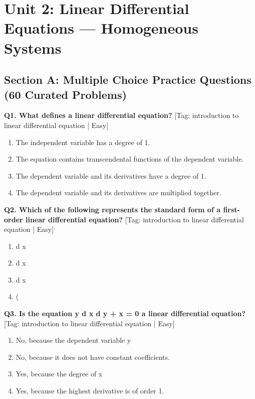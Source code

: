 \chapter{Unit 2: Linear Differential Equations --- Homogeneous Systems}

\section{Section A: Multiple Choice Practice Questions (60 Curated Problems)}

\noindent\textbf{Q1. What defines a linear differential equation?} \hfill [Tag: introduction to linear differential equation | Easy]
\begin{enumerate}[label=(\alph*),topsep=2pt,itemsep=1pt,partopsep=0pt,parsep=0pt]
    \item {{The independent variable has a degree of 1.}}
    \item {{The equation contains transcendental functions of the dependent variable.}}
    \item {{The dependent variable and its derivatives have a degree of 1.}}
    \item {{The dependent variable and its derivatives are multiplied together.}}
\end{enumerate}
\vspace{2mm}

\noindent\textbf{Q2. Which of the following represents the standard form of a first-order linear differential equation?} \hfill [Tag: introduction to linear differential equation | Easy]
\begin{enumerate}[label=(\alph*),topsep=2pt,itemsep=1pt,partopsep=0pt,parsep=0pt]
    \item {{d x}}
    \item {{d x}}
    \item {{d x}}
    \item {{(}}
\end{enumerate}
\vspace{2mm}

\noindent\textbf{Q3. Is the equation y d x d y + x = 0 a linear differential equation?} \hfill [Tag: introduction to linear differential equation | Easy]
\begin{enumerate}[label=(\alph*),topsep=2pt,itemsep=1pt,partopsep=0pt,parsep=0pt]
    \item {{No, because the dependent variable y}}
    \item {{No, because it does not have constant coefficients.}}
    \item {{Yes, because the degree of x}}
    \item {{Yes, because the highest derivative is of order 1.}}
\end{enumerate}
\vspace{2mm}

